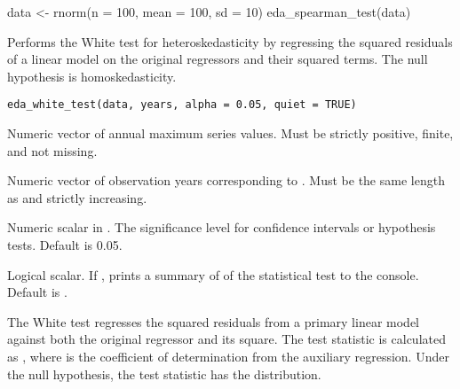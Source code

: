 \documentclass[a4paper]{book}
\begin{document}
%
\begin{Examples}
\begin{ExampleCode}
data <- rnorm(n = 100, mean = 100, sd = 10)
eda_spearman_test(data)

\end{ExampleCode}
\end{Examples}
%
\begin{Description}
Performs the White test for heteroskedasticity by regressing the squared residuals
of a linear model on the original regressors and their squared terms. The null
hypothesis is homoskedasticity.
\end{Description}
%
\begin{Usage}
\begin{verbatim}
eda_white_test(data, years, alpha = 0.05, quiet = TRUE)
\end{verbatim}
\end{Usage}
%
\begin{Arguments}
\begin{ldescription}
\item[\code{data}] Numeric vector of annual maximum series values.
Must be strictly positive, finite, and not missing.

\item[\code{years}] Numeric vector of observation years corresponding to .
Must be the same length as  and strictly increasing.

\item[\code{alpha}] Numeric scalar in \eqn{[0.01, 0.1]}{}. The significance
level for confidence intervals or hypothesis tests. Default is 0.05.

\item[\code{quiet}] Logical scalar. If , prints a summary of of the statistical
test to the console. Default is .
\end{ldescription}
\end{Arguments}
%
\begin{Details}
The White test regresses the squared residuals from a primary linear model
 against both the original regressor and its square.
The test statistic is calculated as , where  is the
coefficient of determination from the auxiliary regression. Under the null
hypothesis, the test statistic has the  distribution.
\end{Details}
%
\end{document}
